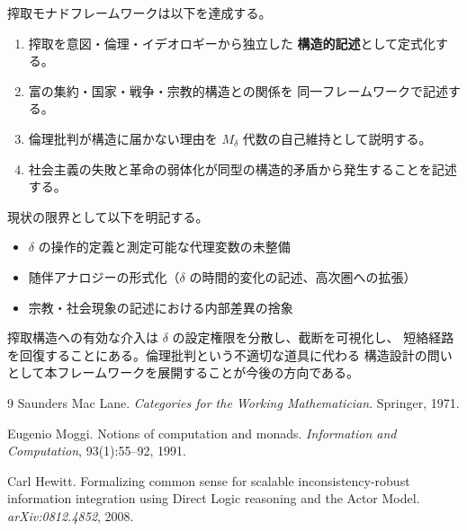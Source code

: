 \documentclass[11pt,a4paper]{ltjsarticle}
\newcommand{\Mdelta}{M_\delta}
\theoremstyle{definition}
\begin{document}
搾取モナドフレームワークは以下を達成する。

\begin{enumerate}
\item 搾取を意図・倫理・イデオロギーから独立した
  \textbf{構造的記述}として定式化する。
\item 富の集約・国家・戦争・宗教的構造との関係を
  同一フレームワークで記述する。
\item 倫理批判が構造に届かない理由を $\Mdelta$ 代数の自己維持として説明する。
\item 社会主義の失敗と革命の弱体化が同型の構造的矛盾から発生することを記述する。
\end{enumerate}

現状の限界として以下を明記する。

\begin{itemize}
\item $\delta$ の操作的定義と測定可能な代理変数の未整備
\item 随伴アナロジーの形式化（$\delta$ の時間的変化の記述、高次圏への拡張）
\item 宗教・社会現象の記述における内部差異の捨象
\end{itemize}

搾取構造への有効な介入は $\delta$ の設定権限を分散し、截断を可視化し、
短絡経路を回復することにある。倫理批判という不適切な道具に代わる
構造設計の問いとして本フレームワークを展開することが今後の方向である。

\begin{thebibliography}{9}
Saunders Mac Lane.
\newblock \emph{Categories for the Working Mathematician}.
\newblock Springer, 1971.

Eugenio Moggi.
\newblock Notions of computation and monads.
\newblock \emph{Information and Computation}, 93(1):55--92, 1991.

Carl Hewitt.
\newblock Formalizing common sense for scalable inconsistency-robust
information integration using {Direct Logic} reasoning and the {Actor Model}.
\newblock \emph{arXiv:0812.4852}, 2008.
\end{thebibliography}
\end{document}
